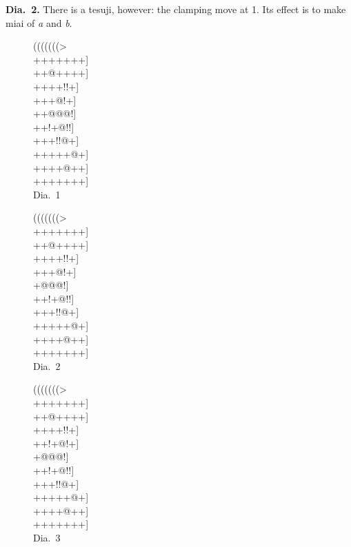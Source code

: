 \documentclass[mcrownvopaper,10pt,oneside,onecolumn,draft,showtrims]{memoir}
\begin{document}
\noindent
\textbf{Dia.\ 2.} There is a tesuji, however: the clamping move at 1. Its effect is
to make miai of \textit{a} and \textit{b}.
\begin{figure}
    \begin{minipage}[c]{0.33\linewidth}
        \centering    
        {\gnos%
        (((((((>\\
        +++++++]\\
        ++@++++]\\
        ++++!!+]\\
        +++@!+]\\
        ++@@@!]\\
        ++!+@!!]\\
        +++!!@+]\\
        +++++@+]\\
        ++++@++]\\
        +++++++]\\
        }
        Dia.\ 1
    \end{minipage}%
    \begin{minipage}[c]{0.34\linewidth}
        \centering    
        {\gnos%
        (((((((>\\
        +++++++]\\
        ++@++++]\\
        ++++!!+]\\
        ++{\gnosw{}}+@!+]\\
        +@@@!]\\
        ++!+@!!]\\
        +++!!@+]\\
        +++++@+]\\
        ++++@++]\\
        +++++++]\\
        }
        Dia.\ 2
    \end{minipage}%
    \begin{minipage}[c]{0.33\linewidth}
        \centering    
        {\gnos%
        (((((((>\\
        +++++++]\\
        ++@++++]\\
        ++++!!+]\\
        ++!+@!+]\\
        +{\gnosw{}}@{\gnosb{}}@@!]\\
        ++!+@!!]\\
        +++!!@+]\\
        +++++@+]\\
        ++++@++]\\
        +++++++]\\
        }
        Dia.\ 3
    \end{minipage}%
\end{figure}
\end{document}
